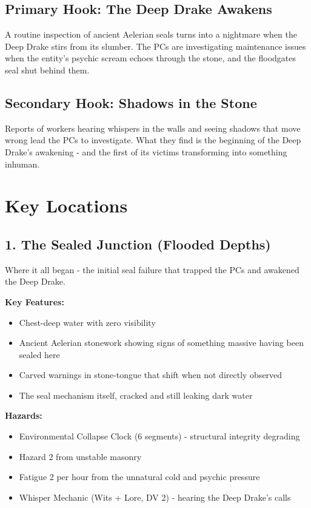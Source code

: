 \documentclass[11pt]{article}
\begin{document}
\subsection{Primary Hook: The Deep Drake Awakens}

A routine inspection of ancient Aelerian seals turns into a nightmare when the Deep Drake stirs from its slumber. The PCs are investigating maintenance issues when the entity's psychic scream echoes through the stone, and the floodgates seal shut behind them.

\subsection{Secondary Hook: Shadows in the Stone}

Reports of workers hearing whispers in the walls and seeing shadows that move wrong lead the PCs to investigate. What they find is the beginning of the Deep Drake's awakening - and the first of its victims transforming into something inhuman.

\section{Key Locations}

\subsection{1. The Sealed Junction (Flooded Depths)}

Where it all began - the initial seal failure that trapped the PCs and awakened the Deep Drake.

\textbf{Key Features:}
\begin{itemize}
\item Chest-deep water with zero visibility
\item Ancient Aelerian stonework showing signs of something massive having been sealed here
\item Carved warnings in stone-tongue that shift when not directly observed
\item The seal mechanism itself, cracked and still leaking dark water
\end{itemize}

\textbf{Hazards:}
\begin{itemize}
\item Environmental Collapse Clock (6 segments) - structural integrity degrading
\item Hazard 2 from unstable masonry
\item Fatigue 2 per hour from the unnatural cold and psychic pressure
\item Whisper Mechanic (Wits + Lore, DV 2) - hearing the Deep Drake's calls
\end{itemize}
\end{document}
